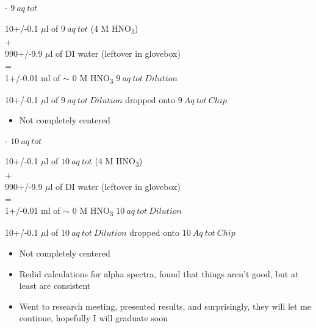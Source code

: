 \documentclass[idxtotoc,hyperref,openany,oneside]{labbook} %
\newcommand{\cmark}{\ding{51}}%
\newcommand{\done}{\rlap{$\square$}{\raisebox{2pt}{\large\hspace{1pt}\cmark}}%
  \hspace{-2.5pt}}
\newcommand{\tsbs}{\textsubscript}
\begin{document}
\begin{todolist}
  \begin{todolist}
  \item[\done]{- $\boxed{9\ aq\ tot}$}
  \end{todolist}
  \begin{center}
    10+/-0.1 $\mu$l of $\boxed{9\ aq\ tot}$
    (4 M HNO\tsbs{3})\\
    +\\
    990+/-9.9 $\mu$l of DI water (leftover in glovebox)\\
  =\\
  1+/-0.01 ml of $\sim$
  0 M HNO\tsbs{3} $\boxed{9\ aq\ tot\ Dilution}$
\end{center}
\begin{center}
  10+/-0.1 $\mu$l of $\boxed{9\ aq\ tot\ Dilution}$ dropped onto
  $\boxed{9\ Aq\ tot\ Chip}$
\end{center}
\begin{itemize}
\item{Not completely centered}
\end{itemize}
  \begin{todolist}
  \item[\done]{- $\boxed{10\ aq\ tot}$}
  \end{todolist}
  \begin{center}
    10+/-0.1 $\mu$l of $\boxed{10\ aq\ tot}$
    (4 M HNO\tsbs{3})\\
    +\\
    990+/-9.9 $\mu$l of DI water (leftover in glovebox)\\
  =\\
  1+/-0.01 ml of $\sim$
  0 M HNO\tsbs{3} $\boxed{10\ aq\ tot\ Dilution}$
\end{center}
\begin{center}
  10+/-0.1 $\mu$l of $\boxed{10\ aq\ tot\ Dilution}$ dropped onto
  $\boxed{10\ Aq\ tot\ Chip}$
\end{center}
\begin{itemize}
\item{Not completely centered}
\end{itemize}
\end{todolist}


\begin{itemize}
\item{Redid calculations for alpha spectra, found that things
  aren't good, but at least are consistent}
\item{Went to research meeting, presented results, and surprisingly,
  they will let me continue, hopefully I will graduate soon}
\end{itemize}
\end{document}
